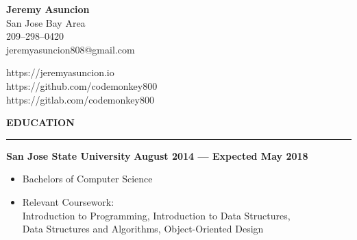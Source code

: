 \documentclass[10pt, oneside]{letter}
\newcommand{\linespaceshit} {
    \vspace{0.05in}
    \hrule
    \vspace{0.05in}
}
\begin{document}
    \begin{minipage}[t]{11cm}
        \flushleft
        \textbf{Jeremy Asuncion} \\
        San Jose Bay Area \\
        209--298--0420 \\
        jeremyasuncion808@gmail.com \\
    \end{minipage}
    \begin{minipage}[t]{7cm}
        \flushright
        https://jeremyasuncion.io \\
        https://github.com/codemonkey800 \\
        https://gitlab.com/codemonkey800 \\
    \end{minipage}

    \vspace{0.1in}

    \textbf{EDUCATION}
    \linespaceshit
        \begin{adjustwidth}{0.1in}{0pt}
            \textbf{San Jose State University} \hfill \textbf{August 2014 --- Expected May 2018}
            \begin{itemize}
                \item Bachelors of Computer Science
                \item Relevant Coursework: \\
                    \hspace*{0.5in} Introduction to Programming, Introduction to Data Structures, \\
                    \hspace*{0.5in} Data Structures and Algorithms, Object-Oriented Design
            \end{itemize}
        \end{adjustwidth}
\end{document}

